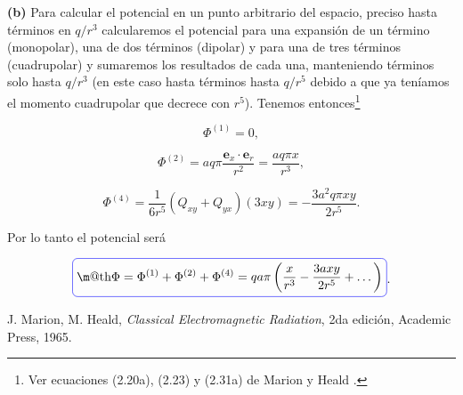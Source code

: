 \documentclass[a4paper,11pt]{article}
\makeatletter
\numberwithin{equation}{section}
\newcommand*{\boxcolor}{blue}
\renewcommand{\boxed}[1]{\textcolor{\boxcolor}{%
\tikz[baseline={([yshift=-1ex]current bounding box.center)}] \node [rectangle, minimum width=1ex,rounded corners,draw] {\normalcolor\m@th$\displaystyle#1$};}}
\makeatother
\begin{document}
\textbf{(b)} Para calcular el potencial en un punto arbitrario del espacio,
preciso hasta términos en $q/r^3$ calcularemos el potencial para una expansión 
de un término (monopolar), una de dos términos (dipolar) y para una de tres 
términos (cuadrupolar) y sumaremos los resultados de cada una, manteniendo términos 
solo hasta $q/r^3$ (en este caso hasta términos hasta $q/r^5$ debido a que ya teníamos 
el momento cuadrupolar que decrece con $r^5$). Tenemos entonces\footnote{Ver 
ecuaciones (2.20a), (2.23) y (2.31a) de Marion y Heald \cite{marion2}.}

\begin{equation}
 \Phi^{(1)} = 0,
\end{equation}

\begin{equation}
 \Phi^{(2)} = aq\pi \frac{\mathbf{e}_x\cdot\mathbf{e}_r}{r^2} = \frac{aq\pi x}{r^3}, 
\end{equation}

\begin{equation}
 \Phi^{(4)} = \frac{1}{6r^5}(Q_{xy} + Q_{yx})(3xy) =  - \frac{3a^2q\pi xy}{2r^5}.
\end{equation}

Por lo tanto el potencial será 

\begin{equation}
 \boxed{\Phi = \Phi^{(1)} + \Phi^{(2)} + \Phi^{(4)} = qa\pi\left(\frac{x}{r^3} - 
 \frac{3axy}{2r^5} + \dots \right)}.
\end{equation}

\begin{thebibliography}{10}
J. Marion, M. Heald, \emph{Classical Electromagnetic Radiation}, 2da edición, Academic 
Press, 1965.
\end{thebibliography}
\end{document}
